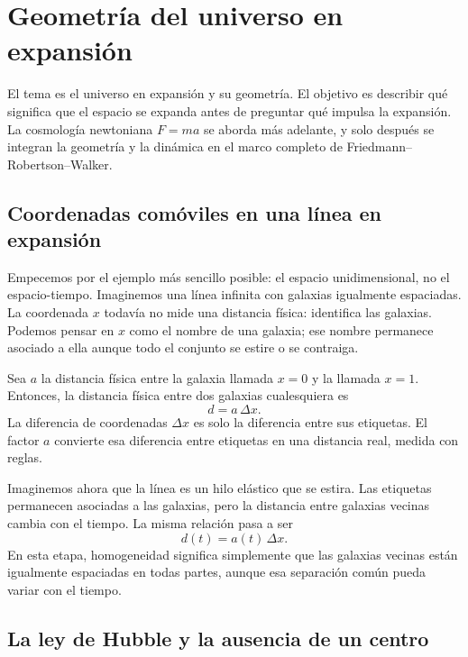 \chapter{Geometría del universo en expansión}

El tema es el universo en expansión y su geometría. El objetivo es describir qué significa que el espacio se expanda antes de preguntar qué impulsa la expansión. La cosmología newtoniana \(F=ma\) se aborda más adelante, y solo después se integran la geometría y la dinámica en el marco completo de Friedmann--Robertson--Walker.

\section{Coordenadas comóviles en una línea en expansión}

Empecemos por el ejemplo más sencillo posible: el espacio unidimensional, no el espacio-tiempo. Imaginemos una línea infinita con galaxias igualmente espaciadas. La coordenada \(x\) todavía no mide una distancia física: identifica las galaxias. Podemos pensar en \(x\) como el nombre de una galaxia; ese nombre permanece asociado a ella aunque todo el conjunto se estire o se contraiga.

Sea \(a\) la distancia física entre la galaxia llamada \(x=0\) y la llamada \(x=1\). Entonces, la distancia física entre dos galaxias cualesquiera es
\begin{equation}
d=a\,\Delta x.
\end{equation}
La diferencia de coordenadas \(\Delta x\) es solo la diferencia entre sus etiquetas. El factor \(a\) convierte esa diferencia entre etiquetas en una distancia real, medida con reglas.

Imaginemos ahora que la línea es un hilo elástico que se estira. Las etiquetas permanecen asociadas a las galaxias, pero la distancia entre galaxias vecinas cambia con el tiempo. La misma relación pasa a ser
\begin{equation}
d(t)=a(t)\,\Delta x.
\end{equation}
En esta etapa, homogeneidad significa simplemente que las galaxias vecinas están igualmente espaciadas en todas partes, aunque esa separación común pueda variar con el tiempo.

\section{La ley de Hubble y la ausencia de un centro}

